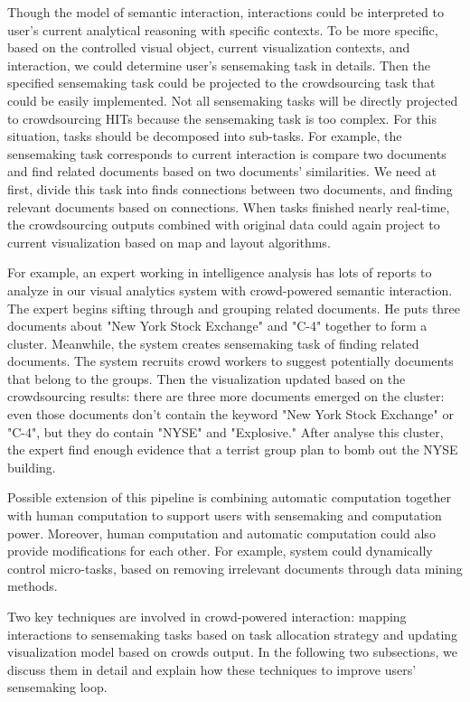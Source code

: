 \documentclass[journal]{vgtc}                %
\begin{document}
Though the model of semantic interaction, interactions could be interpreted to user's current analytical reasoning with specific contexts. To be more specific, based on the controlled visual object, current visualization contexts, and interaction, we could determine user's sensemaking task in details. Then the specified sensemaking task could be projected to the crowdsourcing task that could be easily implemented. Not all sensemaking tasks will be directly projected to crowdsourcing HITs because the sensemaking task is too complex. For this situation, tasks should be decomposed into sub-tasks. For example, the sensemaking task corresponds to current interaction is compare two documents and find related documents based on two documents' similarities. We need at first, divide this task into finds connections between two documents, and finding relevant documents based on connections. When tasks finished nearly real-time, the crowdsourcing outputs combined with original data could again project to current visualization based on map and layout algorithms.

For example, an expert working in intelligence analysis has lots of reports to analyze in our visual analytics system with crowd-powered semantic interaction. The expert begins sifting through and grouping related documents. He puts three documents about "New York Stock Exchange" and "C-4" together to form a cluster. Meanwhile, the system creates sensemaking task of finding related documents. The system recruits crowd workers to suggest potentially documents that belong to the groups. Then the visualization updated based on the crowdsourcing results: there are three more documents emerged on the cluster: even those documents don't contain the keyword "New York Stock Exchange" or "C-4", but they do contain "NYSE" and "Explosive." After analyse this cluster, the expert find enough evidence that a terrist group plan to bomb out the NYSE building.

Possible extension of this pipeline is combining automatic computation together with human computation to support users with sensemaking and computation power. Moreover, human computation and automatic computation could also provide modifications for each other. For example, system could dynamically control micro-tasks, based on removing irrelevant documents through data mining methods.

Two key techniques are involved in crowd-powered interaction: mapping interactions to sensemaking tasks based on task allocation strategy and updating visualization model based on crowds output. In the following two subsections, we discuss them in detail and explain how these techniques to improve users' sensemaking loop.
\end{document}
